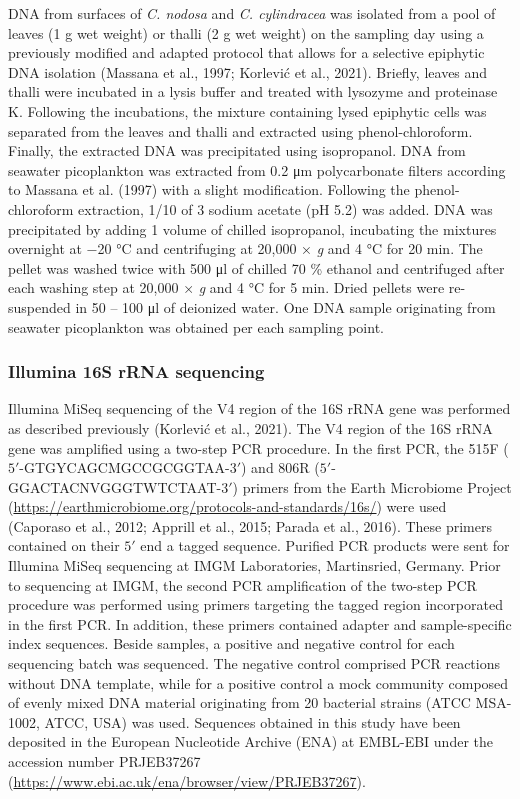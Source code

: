 \documentclass[
  12pt,
]{article}
\begin{document}
DNA from surfaces of \emph{C. nodosa} and \emph{C. cylindracea} was
isolated from a pool of leaves (1 g wet weight) or thalli (2 g wet
weight) on the sampling day using a previously modified and adapted
protocol that allows for a selective epiphytic DNA isolation (Massana et
al., 1997; Korlević et al., 2021). Briefly, leaves and thalli were
incubated in a lysis buffer and treated with lysozyme and proteinase K.
Following the incubations, the mixture containing lysed epiphytic cells
was separated from the leaves and thalli and extracted using
phenol-chloroform. Finally, the extracted DNA was precipitated using
isopropanol. DNA from seawater picoplankton was extracted from 0.2
\si{\um} polycarbonate filters according to Massana et al. (1997) with a
slight modification. Following the phenol-chloroform extraction, 1/10 of
3 \si{\Molar} sodium acetate (pH 5.2) was added. DNA was precipitated by
adding 1 volume of chilled isopropanol, incubating the mixtures
overnight at \num{-20} \si{\degreeCelsius} and centrifuging at 20,000 ×
\emph{g} and 4 \si{\degreeCelsius} for 20 \si{\minute}. The pellet was
washed twice with 500 \si{\ul} of chilled 70 \si{\percent} ethanol and
centrifuged after each washing step at 20,000 × \emph{g} and 4
\si{\degreeCelsius} for 5 \si{\minute}. Dried pellets were re-suspended
in 50 -- 100 \si{\ul} of deionized water. One DNA sample originating
from seawater picoplankton was obtained per each sampling point.

\hypertarget{illumina-16s-rrna-sequencing}{%
\subsubsection{Illumina 16S rRNA
sequencing}\label{illumina-16s-rrna-sequencing}}

Illumina MiSeq sequencing of the V4 region of the 16S rRNA gene was
performed as described previously (Korlević et al., 2021). The V4 region
of the 16S rRNA gene was amplified using a two-step PCR procedure. In
the first PCR, the 515F (\(5'\)-GTGYCAGCMGCCGCGGTAA-\(3'\)) and 806R
(\(5'\)-GGACTACNVGGGTWTCTAAT-\(3'\)) primers from the Earth Microbiome
Project (\url{https://earthmicrobiome.org/protocols-and-standards/16s/})
were used (Caporaso et al., 2012; Apprill et al., 2015; Parada et al.,
2016). These primers contained on their \(5'\) end a tagged sequence.
Purified PCR products were sent for Illumina MiSeq sequencing at IMGM
Laboratories, Martinsried, Germany. Prior to sequencing at IMGM, the
second PCR amplification of the two-step PCR procedure was performed
using primers targeting the tagged region incorporated in the first PCR.
In addition, these primers contained adapter and sample-specific index
sequences. Beside samples, a positive and negative control for each
sequencing batch was sequenced. The negative control comprised PCR
reactions without DNA template, while for a positive control a mock
community composed of evenly mixed DNA material originating from 20
bacterial strains (ATCC MSA-1002, ATCC, USA) was used. Sequences
obtained in this study have been deposited in the European Nucleotide
Archive (ENA) at EMBL-EBI under the accession number PRJEB37267
(\url{https://www.ebi.ac.uk/ena/browser/view/PRJEB37267}).
\end{document}
